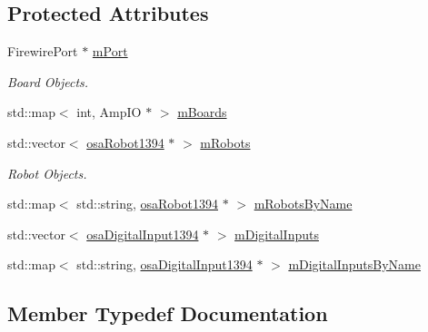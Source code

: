 \subsection*{Protected Attributes}
\begin{DoxyCompactItemize}
\item 
Firewire\+Port $\ast$ \hyperlink{classsaw_robot_i_o1394_1_1osa_port1394_aa0d8a2385466f6861d9b999f2c73406c}{m\+Port}
\begin{DoxyCompactList}\small\item\em Board Objects. \end{DoxyCompactList}\item 
std\+::map$<$ int, Amp\+I\+O $\ast$ $>$ \hyperlink{classsaw_robot_i_o1394_1_1osa_port1394_ad9af20aea070a26638199c54a9bc1d83}{m\+Boards}
\item 
std\+::vector$<$ \hyperlink{classsaw_robot_i_o1394_1_1osa_robot1394}{osa\+Robot1394} $\ast$ $>$ \hyperlink{classsaw_robot_i_o1394_1_1osa_port1394_a3cb60cf6a18b8e0b91576636cb231ea3}{m\+Robots}
\begin{DoxyCompactList}\small\item\em Robot Objects. \end{DoxyCompactList}\item 
std\+::map$<$ std\+::string, \hyperlink{classsaw_robot_i_o1394_1_1osa_robot1394}{osa\+Robot1394} $\ast$ $>$ \hyperlink{classsaw_robot_i_o1394_1_1osa_port1394_a43429f6b99e3a27ba60a626d3ab83367}{m\+Robots\+By\+Name}
\item 
std\+::vector$<$ \hyperlink{classsaw_robot_i_o1394_1_1osa_digital_input1394}{osa\+Digital\+Input1394} $\ast$ $>$ \hyperlink{classsaw_robot_i_o1394_1_1osa_port1394_ad654d5d0706677161e40b7eb723ed976}{m\+Digital\+Inputs}
\item 
std\+::map$<$ std\+::string, \hyperlink{classsaw_robot_i_o1394_1_1osa_digital_input1394}{osa\+Digital\+Input1394} $\ast$ $>$ \hyperlink{classsaw_robot_i_o1394_1_1osa_port1394_a02b4d9862a4db5568382fc665d365820}{m\+Digital\+Inputs\+By\+Name}
\end{DoxyCompactItemize}


\subsection{Member Typedef Documentation}
\hypertarget{classsaw_robot_i_o1394_1_1osa_port1394_a31632fbc6a8e493a8a1e0e48208f43d0}{}
